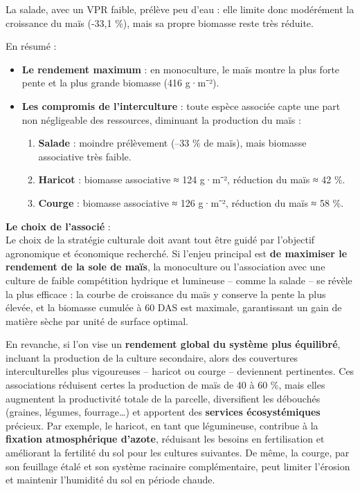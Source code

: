 \documentclass[
]{article}
\begin{document}
La salade, avec un VPR faible, prélève peu d'eau : elle limite donc
modérément la croissance du maïs (-33,1 \%), mais sa propre biomasse
reste très réduite.

En résumé :

\begin{itemize}
\item
  \textbf{Le rendement maximum} : en monoculture, le maïs montre la plus
  forte pente et la plus grande biomasse (416 g·m⁻²).
\item
  \textbf{Les compromis de l'interculture} : toute espèce associée capte
  une part non négligeable des ressources, diminuant la production du
  maïs :

  \begin{enumerate}
  \def\labelenumi{\arabic{enumi}.}
  \item
    \textbf{Salade} : moindre prélèvement (--33 \% de maïs), mais
    biomasse associative très faible.
  \item
    \textbf{Haricot} : biomasse associative ≈ 124 g·m⁻², réduction du
    maïs ≈ 42 \%.
  \item
    \textbf{Courge} : biomasse associative ≈ 126 g·m⁻², réduction du
    maïs ≈ 58 \%.
  \end{enumerate}
\end{itemize}

\textbf{Le choix de l'associé} :\\
Le choix de la stratégie culturale doit avant tout être guidé par
l'objectif agronomique et économique recherché. Si l'enjeu principal est
\textbf{de maximiser le rendement de la sole de maïs}, la monoculture ou
l'association avec une culture de faible compétition hydrique et
lumineuse -- comme la salade -- se révèle la plus efficace : la courbe
de croissance du maïs y conserve la pente la plus élevée, et la biomasse
cumulée à 60 DAS est maximale, garantissant un gain de matière sèche par
unité de surface optimal.

En revanche, si l'on vise un \textbf{rendement global du système plus
équilibré}, incluant la production de la culture secondaire, alors des
couvertures interculturelles plus vigoureuses -- haricot ou courge --
deviennent pertinentes. Ces associations réduisent certes la production
de maïs de 40 à 60 \%, mais elles augmentent la productivité totale de
la parcelle, diversifient les débouchés (graines, légumes,
fourrage\ldots) et apportent des \textbf{services écosystémiques}
précieux. Par exemple, le haricot, en tant que légumineuse, contribue à
la \textbf{fixation atmosphérique d'azote}, réduisant les besoins en
fertilisation et améliorant la fertilité du sol pour les cultures
suivantes. De même, la courge, par son feuillage étalé et son système
racinaire complémentaire, peut limiter l'érosion et maintenir l'humidité
du sol en période chaude.
\end{document}
